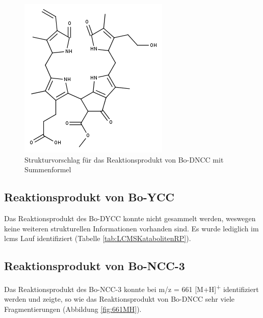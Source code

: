 \begin{figure}[!htbp]
  \centering
  \includegraphics[scale=0.6]{figures/Kapitel7/Kataboliten/fragmentation_structures/VWA_Katabolit_633.png}
  \caption[Strukturvorschlag für das Reaktionsprodukt von Bo-DNCC, Quelle: Autor]{Strukturvorschlag für das Reaktionsprodukt von Bo-DNCC mit Summenformel }
  \label{fig:633MStruktur}
\end{figure}

\pagebreak
\subsection{Reaktionsprodukt von Bo-YCC}

Das Reaktionsprodukt des Bo-DYCC konnte nicht gesammelt werden, weswegen keine weiteren strukturellen Informationen vorhanden sind. Es wurde lediglich im \gls{lcms} Lauf identifiziert (Tabelle \ref{tab:LCMSKatabolitenRP}).

\subsection{Reaktionsprodukt von Bo-NCC-3}

Das Reaktionsprodukt des Bo-NCC-3 konnte bei m/z = 661 [M+H]\textsuperscript{+} identifiziert werden und zeigte, so wie das Reaktionsprodukt von Bo-DNCC sehr viele Fragmentierungen (Abbildung \ref{fig:661MH}). 

